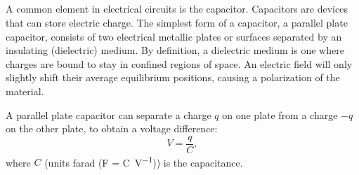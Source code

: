 

\subsection{}
\label{sec:Basics:CapacitiveCurrent}
A common element in electrical circuits is the capacitor. Capacitors are devices that can store electric charge. The simplest form of a capacitor, a parallel plate capacitor, consists of two electrical metallic plates or surfaces separated by an insulating (dielectric) medium. By definition, a dielectric medium is one where charges are bound to stay in confined regions of space. An electric field will only slightly shift their average equilibrium positions, causing a polarization of the material. 

A parallel plate capacitor can separate a charge $q$ on one plate from a charge $-q$ on the other plate, to obtain a voltage difference:
\begin{equation}
V = \frac{q}{C},
\label{eq:Basics:Vcap}
\end{equation}
where $C$ (units farad (\si{\farad} = \si{\coulomb\per\volt})) is the capacitance.

